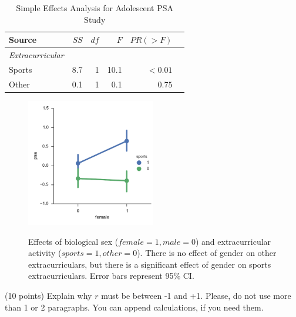 \documentclass[onecolumn,10pt]{jhwhw}
\begin{document}
\begin{table}[htdp]
\begin{center}
\begin{tabular}{l r r r r r}
\toprule
Source & $SS$ & $df$ & $F$ & $PR(>F)$ \\
\midrule
\it{Extracurricular} & & & & \\
\hspace{1em} Sports   & 8.7 &  1  & 10.1 & $<0.01$ \\
\hspace{1em} Other    & 0.1 &  1  &  0.1 & $0.75$\\
\bottomrule
\end{tabular}
\end{center}
\caption{Simple Effects Analysis for Adolescent PSA Study}
\label{psa2}
\end{table}

\begin{figure}[h!]
\begin{center}
\includegraphics[width=0.5\textwidth]{p3.pdf}
\label{fig:on}
\end{center}
\caption{Effects of biological sex ($female=1, male=0$) and extracurricular activity ($sports=1, other=0$). There is no effect of gender on other extracurriculars, but there is a significant effect of gender on sports extracurriculars. Error bars represent 95\% CI.}
\end{figure}

\clearpage
\problem{}
(10 points) Explain why $r$ must be between -1 and +1. Please, do not use more than 1 or 2 paragraphs. You can append calculations, if you need them.\\
\end{document}
